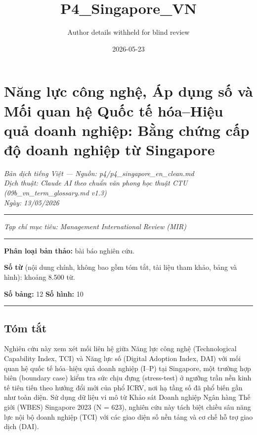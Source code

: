 \documentclass[12pt,a4paper]{article}
\title{P4\_Singapore\_VN}
\author{Author details withheld for blind review}
\date{2026-05-23}
\begin{document}
\maketitle

\hypertarget{nux103ng-lux1ef1c-cuxf4ng-nghux1ec7-uxe1p-dux1ee5ng-sux1ed1-vuxe0-mux1ed1i-quan-hux1ec7-quux1ed1c-tux1ebf-huxf3ahiux1ec7u-quux1ea3-doanh-nghiux1ec7p-bux1eb1ng-chux1ee9ng-cux1ea5p-ux111ux1ed9-doanh-nghiux1ec7p-tux1eeb-singapore}{%
\section{Năng lực công nghệ, Áp dụng số và Mối quan hệ Quốc tế hóa--Hiệu
quả doanh nghiệp: Bằng chứng cấp độ doanh nghiệp từ
Singapore}\label{nux103ng-lux1ef1c-cuxf4ng-nghux1ec7-uxe1p-dux1ee5ng-sux1ed1-vuxe0-mux1ed1i-quan-hux1ec7-quux1ed1c-tux1ebf-huxf3ahiux1ec7u-quux1ea3-doanh-nghiux1ec7p-bux1eb1ng-chux1ee9ng-cux1ea5p-ux111ux1ed9-doanh-nghiux1ec7p-tux1eeb-singapore}}

\emph{Bản dịch tiếng Việt --- Nguồn: p4/p4\_singapore\_en\_clean.md}\\
\emph{Dịch thuật: Claude AI theo chuẩn văn phong học thuật CTU
(09b\_vn\_term\_glossary.md v1.3)}\\
\emph{Ngày: 13/05/2026}

\begin{center}\rule{0.5\linewidth}{0.5pt}\end{center}

\emph{Tạp chí mục tiêu: Management International Review (MIR)}

\begin{center}\rule{0.5\linewidth}{0.5pt}\end{center}

\textbf{Phân loại bản thảo:} bài báo nghiên cứu.

\textbf{Số từ} (nội dung chính, không bao gồm tóm tắt, tài liệu tham
khảo, bảng và hình): khoảng 8.500 từ.

\textbf{Số bảng:} 12 \textbar{} \textbf{Số hình:} 10

\begin{center}\rule{0.5\linewidth}{0.5pt}\end{center}

\hypertarget{tuxf3m-tux1eaft}{%
\subsection{Tóm tắt}\label{tuxf3m-tux1eaft}}

Nghiên cứu này xem xét mối liên hệ giữa Năng lực công nghệ
(Technological Capability Index, TCI) và Năng lực số (Digital Adoption
Index, DAI) với mối quan hệ quốc tế hóa--hiệu quả doanh nghiệp (I--P)
tại Singapore, một trường hợp biên (boundary case) kiểm tra sức chịu
đựng (stress-test) ở ngưỡng trần nền kinh tế tiên tiến theo hướng đổi
mới của phổ ICRV, nơi hạ tầng số đã phổ biến gần như toàn diện. Sử dụng
dữ liệu vi mô từ Khảo sát Doanh nghiệp Ngân hàng Thế giới (WBES)
Singapore 2023 (N = 623), nghiên cứu này tách biệt chiều sâu năng lực
nội bộ doanh nghiệp (TCI) với các giao diện số nền tảng và cơ chế hỗ trợ
giao dịch (DAI).
\end{document}

